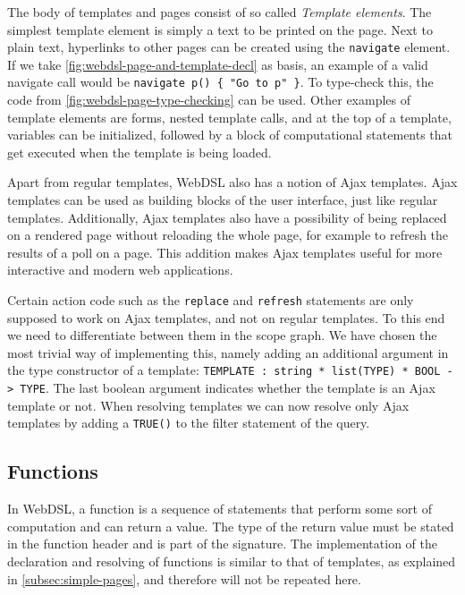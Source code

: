      The body of templates and pages consist of so called \textit{Template elements}. The simplest template element is simply a text to be printed on the page. Next to plain text, hyperlinks to other pages can be created using the \texttt{navigate} element. If we take \cref{fig:webdsl-page-and-template-decl} as basis, an example of a valid navigate call would be \texttt{navigate p() \{ "Go to p" \}}. To type-check this, the code from \cref{fig:webdsl-page-type-checking} can be used. Other examples of template elements are forms, nested template calls, and at the top of a template, variables can be initialized, followed by a block of computational statements that get executed when the template is being loaded.

      Apart from regular templates, WebDSL also has a notion of Ajax templates. Ajax templates can be used as building blocks of the user interface, just like regular templates. Additionally, Ajax templates also have a possibility of being replaced on a rendered page without reloading the whole page, for example to refresh the results of a poll on a page. This addition makes Ajax templates useful for more interactive and modern web applications.

      Certain action code such as the \texttt{replace} and \texttt{refresh} statements are only supposed to work on Ajax templates, and not on regular templates. To this end we need to differentiate between them in the scope graph. We have chosen the most trivial way of implementing this, namely adding an additional argument in the type constructor of a template: \texttt{TEMPLATE : string * list(TYPE) * BOOL -> TYPE}. The last boolean argument indicates whether the template is an Ajax template or not. When resolving templates we can now resolve only Ajax templates by adding a \texttt{TRUE()} to the filter statement of the query.

    \subsection{\label{subsec:simple-functions}Functions}

      In WebDSL, a function is a sequence of statements that perform some sort of computation and can return a value. The type of the return value must be stated in the function header and is part of the signature. The implementation of the declaration and resolving of functions is similar to that of templates, as explained in \cref{subsec:simple-pages}, and therefore will not be repeated here.

